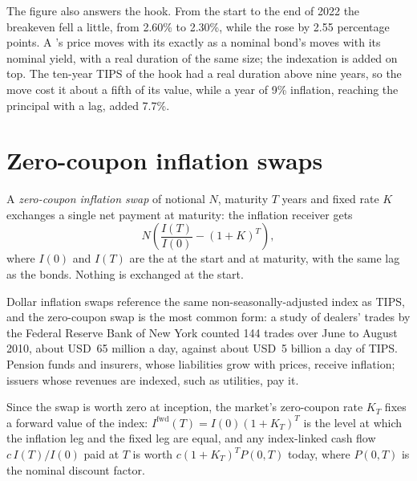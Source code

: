 The figure also answers the hook. From the start to the end of 2022 the
breakeven fell a little, from 2.60\% to 2.30\%, while the  rose by 2.55
percentage points. A 's price moves with its  exactly as a
nominal bond's moves with its nominal yield, with a real duration of the same
size; the indexation is added on top. The ten-year TIPS of the hook had a real
duration above nine years, so the move cost it about a fifth of its value,
while a year of 9\% inflation, reaching the principal with a lag, added 7.7\%.

\section{Zero-coupon inflation swaps}

\begin{definition}\label{def:m2:inflation-markets:zciis}
A \emph{zero-coupon inflation swap} of notional
$N$, maturity $T$ years and fixed rate $K$ exchanges a single net payment at
maturity: the inflation receiver gets
\[
N\left(\frac{I(T)}{I(0)} - (1+K)^T\right),
\]
where $I(0)$ and $I(T)$ are the  at the start and at maturity,
with the same lag as the bonds. Nothing is exchanged at the start.
\end{definition}

Dollar inflation swaps reference the same non-seasonally-adjusted index as
TIPS, and the zero-coupon swap is the most common form: a study of dealers'
trades by the Federal Reserve Bank of New York counted 144 trades over June to
August 2010, about USD~65 million a day, against about USD~5 billion a day of
TIPS. Pension funds and insurers, whose liabilities grow with prices, receive
inflation; issuers whose revenues are indexed, such as utilities, pay it.

\begin{proposition}\label{prop:m2:inflation-markets:forward}
Since the swap is worth zero at inception, the market's zero-coupon rate $K_T$
fixes a forward value of the index: $I^{\mathrm{fwd}}(T) = I(0)(1+K_T)^T$ is the
level at which the inflation leg and the fixed leg are equal, and any
index-linked cash flow $c\,I(T)/I(0)$ paid at $T$ is worth
$c(1+K_T)^T P(0,T)$ today, where $P(0,T)$ is the nominal discount factor.
\end{proposition}

